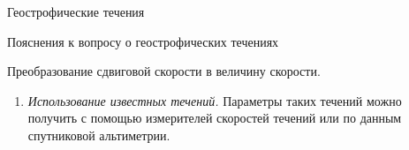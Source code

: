 \begin{chapter}{Геострофические течения}
\begin{section}{Пояснения к вопросу о геострофических течениях}
\begin{paragraph}{Преобразование сдвиговой скорости в величину скорости. }
\begin{enumerate}
\begin{figure}[t!]
\caption{Средняя геопотенциальная аномалия относительно уровня 1000
децибар в Тихом океане, по данным 36356 наблюдений. Высоты аномалий
приведены в геопотенциальных сантиметрах. Если бы скорость циркуляции
на уровне 1000 децибар была равна нулю, то этот рисунок представлял бы
собой топографическую поверхность Тихого океана. По данным Виртки
(1979).}
\label{fig:wyrtkiplot}
\end{figure}
%

\item
\emph{Использование известных течений.} Параметры таких течений можно
получить с помощью измерителей скоростей течений или по данным
спутниковой альтиметрии.


\end{enumerate}
\end{paragraph}
\end{section}
\end{chapter}

